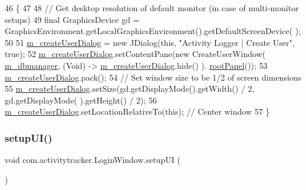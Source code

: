 \begin{DoxyCode}
46                                          \{
47 
48         \textcolor{comment}{// Get desktop resolution of default monitor (in case of multi-monitor setups)}
49         \textcolor{keyword}{final} GraphicsDevice gd = GraphicsEnvironment.getLocalGraphicsEnvironment().getDefaultScreenDevice(
      );
50 
51         \mbox{\hyperlink{classcom_1_1activitytracker_1_1_login_window_a49ff7093e29ce7bd22c42ac8099d5d34}{m\_createUserDialog}} = \textcolor{keyword}{new} JDialog(\textcolor{keyword}{this}, \textcolor{stringliteral}{"Activity Logger | Create User"}, \textcolor{keyword}{true});
52         \mbox{\hyperlink{classcom_1_1activitytracker_1_1_login_window_a49ff7093e29ce7bd22c42ac8099d5d34}{m\_createUserDialog}}.setContentPane(\textcolor{keyword}{new} CreateUserWindow(
      \mbox{\hyperlink{classcom_1_1activitytracker_1_1_login_window_a1d278c8158f803151737943e9ea2a9bf}{m\_dbmanager}}, (Void) -> \mbox{\hyperlink{classcom_1_1activitytracker_1_1_login_window_a49ff7093e29ce7bd22c42ac8099d5d34}{m\_createUserDialog}}.hide() ).
      \mbox{\hyperlink{classcom_1_1activitytracker_1_1_login_window_ab1ea45e86bbb79bccd06531279f1e443}{rootPanel}}());
53         \mbox{\hyperlink{classcom_1_1activitytracker_1_1_login_window_a49ff7093e29ce7bd22c42ac8099d5d34}{m\_createUserDialog}}.pack();
54         \textcolor{comment}{// Set window size to be 1/2 of screen dimensions}
55         \mbox{\hyperlink{classcom_1_1activitytracker_1_1_login_window_a49ff7093e29ce7bd22c42ac8099d5d34}{m\_createUserDialog}}.setSize(gd.getDisplayMode().getWidth() / 2, gd.getDisplayMode(
      ).getHeight() / 2);
56         \mbox{\hyperlink{classcom_1_1activitytracker_1_1_login_window_a49ff7093e29ce7bd22c42ac8099d5d34}{m\_createUserDialog}}.setLocationRelativeTo(\textcolor{keyword}{this}); \textcolor{comment}{// Center window}
57     \}
\end{DoxyCode}
\mbox{\label{classcom_1_1activitytracker_1_1_login_window_a7af9edf52b3028437e2159f0be9893a9}} 
\subsubsection{\texorpdfstring{setup\+U\+I()}{setupUI()}}
{\footnotesize\ttfamily void com.\+activitytracker.\+Login\+Window.\+setup\+UI (\begin{DoxyParamCaption}{ }\end{DoxyParamCaption})\hspace{0.3cm}{\ttfamily [private]}}



